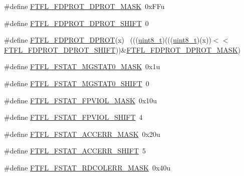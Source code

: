 \begin{DoxyCompactItemize}
\item 
\#define \hyperlink{group___f_t_f_l___register___masks_ga308c1d923b4ad70d0ac4445e8cb09ac0}{F\+T\+F\+L\+\_\+\+F\+D\+P\+R\+O\+T\+\_\+\+D\+P\+R\+O\+T\+\_\+\+M\+A\+SK}~0x\+F\+Fu
\item 
\#define \hyperlink{group___f_t_f_l___register___masks_ga36e2c6a1672ab6425d570dc3b4d6b812}{F\+T\+F\+L\+\_\+\+F\+D\+P\+R\+O\+T\+\_\+\+D\+P\+R\+O\+T\+\_\+\+S\+H\+I\+FT}~0
\item 
\#define \hyperlink{group___f_t_f_l___register___masks_ga06896c18fa0af8a7f0fd652784fcda66}{F\+T\+F\+L\+\_\+\+F\+D\+P\+R\+O\+T\+\_\+\+D\+P\+R\+OT}(x)                                      ~(((\hyperlink{_p_e___types_8h_aba7bc1797add20fe3efdf37ced1182c5}{uint8\+\_\+t})(((\hyperlink{_p_e___types_8h_aba7bc1797add20fe3efdf37ced1182c5}{uint8\+\_\+t})(x))$<$$<$\hyperlink{group___f_t_f_l___register___masks_ga36e2c6a1672ab6425d570dc3b4d6b812}{F\+T\+F\+L\+\_\+\+F\+D\+P\+R\+O\+T\+\_\+\+D\+P\+R\+O\+T\+\_\+\+S\+H\+I\+FT}))\&\hyperlink{group___f_t_f_l___register___masks_ga308c1d923b4ad70d0ac4445e8cb09ac0}{F\+T\+F\+L\+\_\+\+F\+D\+P\+R\+O\+T\+\_\+\+D\+P\+R\+O\+T\+\_\+\+M\+A\+SK})
\item 
\#define \hyperlink{group___f_t_f_l___register___masks_gad88c4e31804691b13fa67b4e36bca9ae}{F\+T\+F\+L\+\_\+\+F\+S\+T\+A\+T\+\_\+\+M\+G\+S\+T\+A\+T0\+\_\+\+M\+A\+SK}~0x1u
\item 
\#define \hyperlink{group___f_t_f_l___register___masks_gae33faa3f10ce55c1955c3bc20190e189}{F\+T\+F\+L\+\_\+\+F\+S\+T\+A\+T\+\_\+\+M\+G\+S\+T\+A\+T0\+\_\+\+S\+H\+I\+FT}~0
\item 
\#define \hyperlink{group___f_t_f_l___register___masks_ga01be669b3badf964a2db479cc61155b1}{F\+T\+F\+L\+\_\+\+F\+S\+T\+A\+T\+\_\+\+F\+P\+V\+I\+O\+L\+\_\+\+M\+A\+SK}~0x10u
\item 
\#define \hyperlink{group___f_t_f_l___register___masks_ga45d86da8dc4233e6882aad64743b3449}{F\+T\+F\+L\+\_\+\+F\+S\+T\+A\+T\+\_\+\+F\+P\+V\+I\+O\+L\+\_\+\+S\+H\+I\+FT}~4
\item 
\#define \hyperlink{group___f_t_f_l___register___masks_ga5ce6aed459fb58e0c75f6b46a34dc3e3}{F\+T\+F\+L\+\_\+\+F\+S\+T\+A\+T\+\_\+\+A\+C\+C\+E\+R\+R\+\_\+\+M\+A\+SK}~0x20u
\item 
\#define \hyperlink{group___f_t_f_l___register___masks_ga96524c0503f7920b242fd345e33246d6}{F\+T\+F\+L\+\_\+\+F\+S\+T\+A\+T\+\_\+\+A\+C\+C\+E\+R\+R\+\_\+\+S\+H\+I\+FT}~5
\item 
\#define \hyperlink{group___f_t_f_l___register___masks_ga8aa3ae8a1526551f7f85657da0524ba2}{F\+T\+F\+L\+\_\+\+F\+S\+T\+A\+T\+\_\+\+R\+D\+C\+O\+L\+E\+R\+R\+\_\+\+M\+A\+SK}~0x40u
$$
\end{DoxyCompactItemize}
